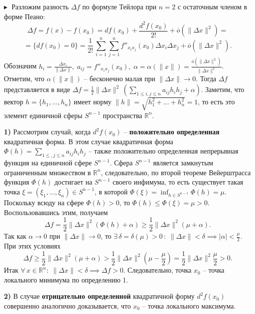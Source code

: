 $\blacktriangleright\;$ Разложим разность $\Delta f$ по формуле Тейлора при $n = 2$ с остаточным членом в форме Пеано:
$$
\Delta f = f(x) - f(x_0) = d f(x_0) + \frac{d^2 f(x_0)}{2!} + \overline{o}(\|\Delta x\|^2) =$$
$$= \{ d f(x_0) = 0\} = \frac{1}{2!}\,\sum_{i = 1}^n \sum_{j =1}^n f''_{x_i x_j}(x_0) \Delta x_i \Delta x_j + \overline{o}(\|\Delta x\|^2).
$$
Обозначим $h_i = \frac{\Delta x_i}{\|\Delta x\|}, \; a_{ij} = f''_{x_i x_j}(x_0), \; \alpha = \alpha (\|x\|) = \frac{\overline{o}(\|\Delta x\|^2)}{\|\Delta x\|^2}$. 
Отметим, что $\alpha(\|x\|)$ -- бесконечно малая при $\|\Delta x\| \to 0$. 
Тогда $\Delta f$ представляется в виде $\Delta f = \frac{1}{2}\|\Delta x\|^2\, \left( \sum_{1\leq i, j \leq n} a_{ij} h_i h_j + \alpha\right)$. 
Заметим, что вектор $h = \{ h_1, \ldots, h_n\}$ имеет норму $\|h\| = \sqrt{h_1^2 + \ldots + h_n^2} = 1$, то есть это элемент единичной сферы $S^{n-1}$ пространства $\mathbb{R}^n$.

\textbf{1)} Рассмотрим случай, когда $d^2 f(x_0)$ -- \textbf{положительно определенная} квадратичная форма. 
В этом случае квадратичная форма $\Phi(h) = \sum_{1\leq , j \leq n} a_{ij}h_i h_j$ -- также положительно определенная непрерывная функция на единичной сфере $S^{n-1}$. 
Сфера $S^{n-1}$ является замкнутым ограниченным множеством в $\mathbb{R}^n$, следовательно, по второй теореме Вейерштрасса функция $\Phi(h)$ достигает на $S^{n-1}$ своего инфимума, то есть существует такая точка $\xi = (\xi_1, \ldots, \xi_n) \in S^{n-1}$, в которой $\Phi(\xi) = \inf_{h \in S^{n-1}} \Phi(h) = \mu$. 
Поскольку всюду на сфере $\Phi(h) > 0$, то $\Phi(h) \leq \Phi(\xi) = \mu > 0$. Воспользовавшись этим, получаем 
$$
\Delta f = \frac{1}{2} \|\Delta x\|^2 (\Phi(h) + \alpha) \geq \frac{1}{2} \|\Delta x\|^2 (\mu + \alpha).
$$
Так как $\alpha \to 0$ при $\|\Delta x\| \to 0$, то $\exists \, \delta = \delta (\mu) > 0 \,:\; \|\Delta x\| < \delta \implies |\alpha| < \frac{\mu}{2}$.
При этих условиях 
$$
\Delta f \geq \frac{1}{2} \|\Delta x\|^2 (\mu + \alpha) > \frac{1}{2} \|\Delta x\|^2 (\mu - \frac{\mu}{2}) = \frac{1}{2} \|\Delta x\|^2 \frac{\mu}{2} > 0.
$$
Итак $\forall\, x \in \mathbb{R}^n : \; \|\Delta x\| < \delta \implies \Delta f > 0 $. Следовательно, точка $x_0$ -- точка локального минимума по определению 1.

\textbf{2)} В случае \textbf{отрицательно определенной} квадратичной форму $d^2 f(x_0)$ совершенно аналогично доказывается, что $x_0$ -- точка локального максимума.


